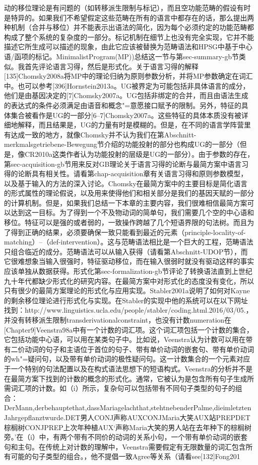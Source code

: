 动的移位理论是有问题的（如转移派生限制与标记），而且空功能范畴的假设有时是特异的。如果我们不希望假定这些范畴在所有的语言中都存在的话，那么提出两种机制（合并与移位）并不能表示出语法的简化，因为每个必须约定的功能范畴都构成了整个系统的复杂度的一部分。标记机制在细节上也没有完全实现，它并不能描述它所生成可以描述的现象，由此它应该被替换为范畴语法和HPSG中基于中心语/函项的标记。MinimalistProgram(MP))总结这一节与第sec-summary-gb节类似。我首先评论语言习得，然后是形式化。关于语言习得的解释[135]Chomsky2008a将MP中的理论归纳为原则参数分析，并将MP参数确定在词汇中。也可以参考[396]Hornstein2013a。UG被界定为可能包括非具体语言的成分，他们是由基因决定的[7]Chomsky2007a。UG包括非绑定的合并，而且由语法生成的表达式的条件必须满足由语音和概念"=意愿接口赋予的限制。另外，特征的具体集合被看作是UG的一部分[6--7]Chomsky2007a。这些特征的具体本质没有被详细地解释，而且结果是，UG的力量有时是模糊的。但是，在不同的语言学阵营里有达成一致的地方，就像Chomsky并不认为我们在第Abschnitt-merkmalsgetriebene-Bewegung节介绍的功能投射的部分也构成UG的一部分（但是，像CR2010a这类作者认为功能投射的层级是UG的一部分）。由于参数的存在，第sec-acquisition-gb节用来反对GB理论关于语言习得的论断与最简方案中语言习得的论断具有相关性。请看第chap-acquisition章有关语言习得和原则参数模型，以及基于输入的方法的深入讨论。Chomsky在最简方案中的主要目标是简化语言的形式属性的理论假说，以及用来使得他们和相关部分是我们的基因天赋的一部分的计算机制。但是，如果我们总结一下本章的主要内容，我们很难相信最简方案可以达到这一目标。为了得到一个不及物动词的简单句，我们需要几个空的中心语和移位。特征可以是强的或者弱的，一致操作跨越了几个短语界限的句法树。而且为了得到正确的结果，必须要确保一致只能看到最近的元素（principle-locality-of-matching）--（def-intervention）。这与范畴语法相比是一个巨大的工程，范畴语法只组合临近的成分。范畴语法可以从输入获得（请看第Abschnitt-UDOP节），而它很难想象当输入很强时，特征驱动移位，而在输入很弱时就没有驱动这样的事实应该单独从数据获得。形式化第sec-formalization-gb节评论了转换语法直到上世纪九十年代都缺少形式化的研究内容。在最简方案中对形式化的态度没有变化，所以只有很少的最简方案理论的形式化与应用实现。Stabler2001a说明了如何对Kayne的剩余移位理论进行形式化与实现。在Stabler的实现中他的系统可以在以下网址找到：http://www.linguistics.ucla.edu/people/stabler/coding.html.2016/03/05.，并没有转移派生限制transderivationalconstraint，也没有计数numeration在[Chapter9]Veenstra98a中有一个计数的词汇项。这个词汇项包括一个计数的集合，它包括功能中心语，可以用在某类句子中。比如说，Veenstra认为计数可以用在带有二价动词的句子和主语位于首位的句子、带有单价动词的嵌套句、带有单价动词的wh"=疑问句，以及带有单价动词的极性疑问句。这一计数集合的一个元素对应于一个特别的句法配置以及在构式语法思想下的短语构式。Veenstra的分析并不是在最简方案下找到的计数的概念的形式化。通常，它被认为是包含所有句子生成所需词汇项的计数。如（i）所示，复杂句可以包括带有不同句子类型的句子的组合：DerMann,derbehauptethat,dassMariagelachthat,stehtnebenderPalme,dieimletztenJahrgepflanztwurde.DET男人CONJ声称AUXCONJMaria大笑AUX站PREPDET棕榈树CONJPREP上次年种植AUX`声称Maria大笑的男人站在去年种下的棕榈树旁。'在（i）中，有两个带有不同价的动词的关系小句，一个带有单价动词的嵌套句和主句。在传统上对计数的理解中，Veenstra需要假定有无限数量的词汇包含所有可能的句子类型的组合。，他不提倡一致Agree等关系（请看see[132]Fong201